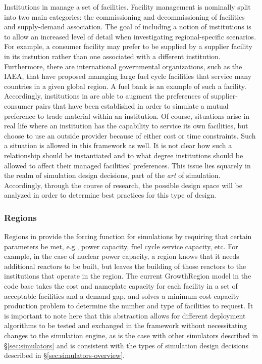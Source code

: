 Institutions in \Cyclus manage a set of facilities. Facility management is
nominally split into two main categories: the commissioning and decommissioning
of facilities and supply-demand association. The goal of including a notion of
institutions is to allow an increased level of detail when investigating
regional-specific scenarios. For example, a consumer facility may prefer to be
supplied by a supplier facility in its instution rather than one associated with
a different institution. Furthermore, there are international governmental
organizations, such as the IAEA, that have proposed managing large fuel cycle
facilities that service many countries in a given global region. A fuel bank is
an example of such a facility. Accordingly, institutions in \Cyclus are able to
augment the preferences of supplier-consumer pairs that have been established in
order to simulate a mutual preference to trade material within an
institution. Of course, situations arise in real life where an institution has
the capability to service its own facilities, but choose to use an outside
provider because of either cost or time constraints. Such a situation is allowed
in this framework as well. It is not clear how such a relationship should be
instantiated and to what degree institutions should be allowed to affect their
managed facilities' preferences. This issue lies squarely in the realm of
simulation design decisions, part of the \textit{art} of
simulation. Accordingly, through the course of research, the possible design
space will be analyzed in order to determine best practices for this type of
design.

\subsubsection{Regions}

Regions in \Cyclus provide the forcing function for simulations by requiring
that certain parameters be met, e.g., power capacity, fuel cycle service
capacity, etc. For example, in the case of nuclear power capacity, a region
knows that it needs additional reactors to be built, but leaves the building of
those reactors to the institutions that operate in the region. The current
GrowthRegion model in the \Cycamore \cite{cycamore2013} code base takes the cost
and nameplate capacity for each facility in a set of acceptable facilities and a
demand gap, and solves a minimum-cost capacity production problem to determine
the number and type of facilities to request. It is important to note here that
this abstraction allows for different deployment algorithms to be tested and
exchanged in the \Cyclus framework without necessitating changes to the
simulation engine, as is the case with other simulators described
in \S\ref{sec:simulators} and is consistent with the types of simulation design
decisions described in
\S\ref{sec:simulators-overview}. 

